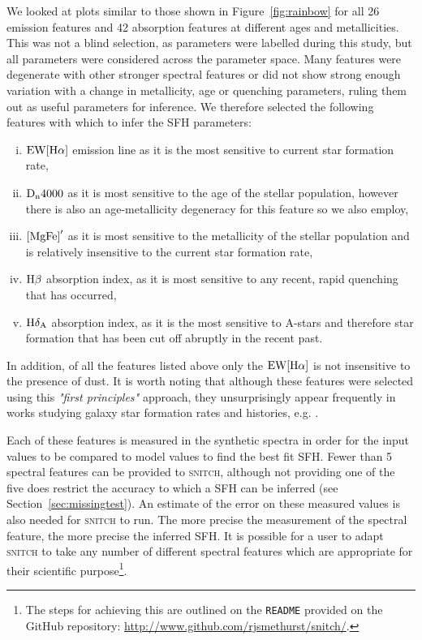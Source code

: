 \documentclass[useAMS,usenatbib]{mn2e}
\begin{document}
We looked at plots similar to those shown in Figure~\ref{fig:rainbow} for all 26 emission features and 42 absorption features at different ages and metallicities. This was not a blind selection, as parameters were labelled during this study, but all parameters were considered across the parameter space. Many features were degenerate with other stronger spectral features or did not show strong enough variation with a change in metallicity, age or quenching parameters, ruling them out as useful parameters for inference. We therefore selected the following features with which to infer the SFH parameters:
\begin{enumerate}[(i)]
\item $\rm{EW}[H\alpha]$ emission line as it is the most sensitive to current star formation rate,


\item $\rm{D}_n4000$ as it is most sensitive to the age of the stellar population, however there is also an age-metallicity degeneracy for this feature so we also employ,

\item $\rm{[MgFe]}^{\prime}$ as it is most sensitive to the metallicity of the stellar population and is relatively insensitive to the current star formation rate,

\item $\rm{H}\beta$ absorption index, as it is most sensitive to any recent, rapid quenching that has occurred,

\item $\rm{H}\delta_A$ absorption index, as it is the most sensitive to A-stars and therefore star formation that has been cut off abruptly in the recent past.


\end{enumerate}

In addition, of all the features listed above only the $\rm{EW}[H\alpha]$ is not insensitive to the presence of dust. It is worth noting that although these features were selected using this \emph{"first principles"} approach, they unsurprisingly appear frequently in works studying galaxy star formation rates and histories, e.g. \cite{kauffmann03}.

Each of these features is measured in the synthetic spectra in order for the input values to be compared to model values to find the best fit SFH. Fewer than 5 spectral features can be provided to \textsc{snitch}, although not providing one of the five does restrict the accuracy to which a SFH can be inferred (see Section~\ref{sec:missingtest}). An estimate of the error on these measured values is also needed for \textsc{snitch} to run. The more precise the measurement of the spectral feature, the more precise the inferred SFH. It is possible for a user to adapt \textsc{snitch} to take any number of different spectral features which are appropriate for their scientific purpose\footnote{The steps for achieving this are outlined on the \texttt{README} provided on the GitHub repository: \url{http://www.github.com/rjsmethurst/snitch/}.}.
\end{document}
